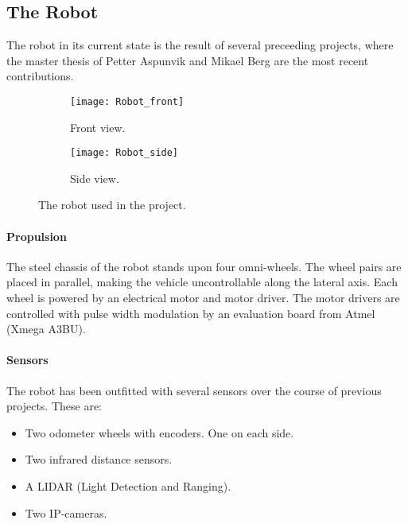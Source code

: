 \subsection{The Robot} 

The robot in its current state is the result of several preceeding projects, where the master thesis of Petter Aspunvik \cite{aspunvik} and Mikael Berg \cite{berg} are the most recent contributions. 

\begin{figure}
\centering
 \begin{subfigure}[b]{0.3\textwidth}
        \texttt{[image: Robot\_front]}
        \caption{Front view.}
        \label{fig:RobotFront}
    \end{subfigure}
    \begin{subfigure}[b]{0.65\textwidth}
        \texttt{[image: Robot\_side]}
        \caption{Side view.}
        \label{fig:RobotSide}
    \end{subfigure}
    \caption{\label{fig:RobotView}The robot used in the project.}
\end{figure}

\paragraph{Propulsion}

The steel chassis of the robot stands upon four omni-wheels. The wheel pairs are placed in parallel, making the vehicle uncontrollable along the lateral axis. Each wheel is powered by an electrical motor and motor driver. The motor drivers are controlled with pulse width modulation by an evaluation board from Atmel (Xmega A3BU).  

\paragraph{Sensors}

The robot has been outfitted with several sensors over the course of previous projects. These are:
\begin{itemize}
	\item Two odometer wheels with encoders. One on each side. 
	\item Two infrared distance sensors. 
	\item A LIDAR (Light Detection and Ranging).
	\item Two IP-cameras.
\end{itemize} 

